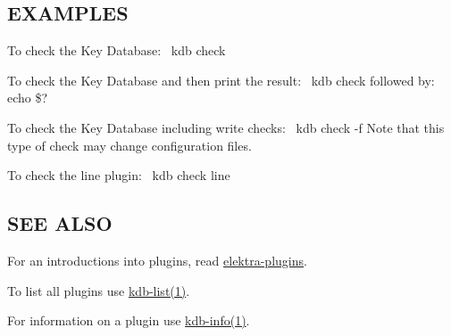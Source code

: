 \subsection*{E\+X\+A\+M\+P\+L\+ES}

To check the Key Database\+:~\newline
 {\ttfamily kdb check}

To check the Key Database and then print the result\+:~\newline
 {\ttfamily kdb check} followed by\+:~\newline
 {\ttfamily echo \$?}

To check the Key Database including write checks\+:~\newline
 {\ttfamily kdb check -\/f} Note that this type of check may change configuration files.

To check the {\ttfamily line} plugin\+:~\newline
 {\ttfamily kdb check line}

\subsection*{S\+EE A\+L\+SO}


\begin{DoxyItemize}
\item For an introductions into plugins, read \hyperlink{md_src_plugins_README_src_plugins_README_md}{elektra-\/plugins}.
\item To list all plugins use \hyperlink{md_doc_help_kdb-list_doc_help_kdb-list_md}{kdb-\/list(1)}.
\item For information on a plugin use \hyperlink{md_doc_help_kdb-info_doc_help_kdb-info_md}{kdb-\/info(1)}. 
\end{DoxyItemize}